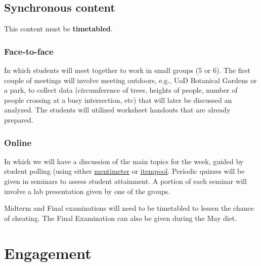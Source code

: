 \documentclass[
]{book}
\providecommand{\tightlist}{%
  \setlength{\itemsep}{0pt}\setlength{\parskip}{0pt}}
\begin{document}
\hypertarget{synchronous-content}{%
\section*{Synchronous content}\label{synchronous-content}}

This content must be \textbf{timetabled}.

\hypertarget{face-to-face}{%
\subsection*{Face-to-face}\label{face-to-face}}

\begin{description}
\tightlist
\item[Workshops (PRACTICING, COLLABORATING, DISCUSSING)]
In which students will meet together to work in small groups (5 or 6). The first couple of meetings will involve meeting outdoors, e.g., UoD Botanical Gardens or a park, to collect data (circumference of trees, heights of people, number of people crossing at a busy intersection, etc) that will later be discussed an analyzed. The students will utilized worksheet handouts that are already prepared.
\end{description}

\hypertarget{online}{%
\subsection*{Online}\label{online}}

\begin{description}
\tightlist
\item[Seminars (DISCUSSING, PRODUCING, PRACTICING)]
In which we will have a discussion of the main topics for the week, guided by student polling (using either \href{https://www.mentimeter.com/}{mentimeter} or \href{https://itempool.com/}{itempool}. Periodic quizzes will be given in seminars to assess student attainment. A portion of each seminar will involve a lab presentation given by one of the groups.
\item[Examinations (PRODUCING)]
Midterm and Final examinations will need to be timetabled to lessen the chance of cheating. The Final Examination can also be given during the May diet.
\end{description}

\hypertarget{engagement}{%
\chapter{Engagement}\label{engagement}}
\end{document}
